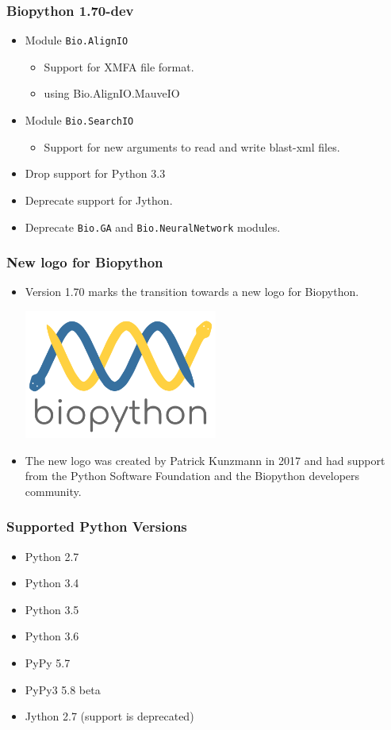 \documentclass[trans]{beamer}
\begin{document}
\frame
{
  \frametitle{Biopython 1.70-dev}

  \begin{itemize}
  \item Module \texttt{Bio.AlignIO}
  \begin{itemize}
  \item Support for XMFA file format.
  \item using Bio.AlignIO.MauveIO
  \end{itemize}
  \end{itemize}
  \begin{itemize}
  \item Module \texttt{Bio.SearchIO}
  \begin{itemize}
  \item Support for new arguments to read and write blast-xml files.
  \end{itemize}
  \item Drop support for Python 3.3
  \item Deprecate support for Jython.
  \item Deprecate \texttt{Bio.GA} and \texttt{Bio.NeuralNetwork} modules.
  \end{itemize}

}
\frame
{
  \frametitle{New logo for Biopython}

  \begin{itemize}
  \item Version 1.70 marks the transition towards a new logo for Biopython.

  \begin{center}
  \includegraphics[width=0.5\textwidth]{figures/biopython_logo_s.png}
  \end{center}

  \item The new logo was created by Patrick Kunzmann in 2017 and had support from the Python Software Foundation and the Biopython developers community.
  \end{itemize}

}
\frame
{
  \frametitle{Supported Python Versions}

  \begin{itemize}
  \item Python 2.7
  \item Python 3.4
  \item Python 3.5
  \item Python 3.6
  \item PyPy 5.7
  \item PyPy3 5.8 beta
  \item Jython 2.7 (support is deprecated)
  \end{itemize}
}
\end{document}
